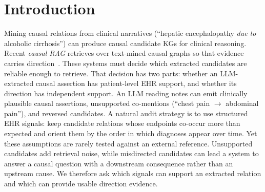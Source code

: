 \documentclass[runningheads]{llncs}
\begin{document}
\section{Introduction}
Mining causal relations from clinical narratives (``hepatic encephalopathy \emph{due to} alcoholic cirrhosis'') can produce causal candidate KGs for clinical reasoning. Recent \emph{causal RAG} retrieves over text-mined causal graphs so that evidence carries direction~\cite{wang2025causalrag}. These systems must decide which extracted candidates are reliable enough to retrieve. That decision has two parts: whether an LLM-extracted causal assertion has patient-level EHR support, and whether its direction has independent support. An LLM reading notes can emit clinically plausible causal assertions, unsupported co-mentions (``chest pain $\rightarrow$ abdominal pain''), and reversed candidates. A natural audit strategy is to use structured EHR signals: keep candidate relations whose endpoints co-occur more than expected and orient them by the order in which diagnoses appear over time. Yet these assumptions are rarely tested against an external reference. Unsupported candidates add retrieval noise, while misdirected candidates can lead a system to answer a causal question with a downstream consequence rather than an upstream cause. We therefore ask which signals can support an extracted relation and which can provide usable direction evidence.%
\end{document}
